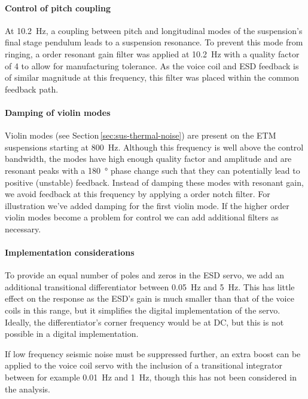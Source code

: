 \paragraph{Control of pitch coupling}
At \SI{10.2}{\hertz}, a coupling between pitch and longitudinal modes of the suspension's final stage pendulum leads to a suspension resonance. To prevent this mode from ringing, a  order resonant gain filter was applied at \SI{10.2}{\hertz} with a quality factor of \num{4} to allow for manufacturing tolerance. As the voice coil and \gls{ESD} feedback is of similar magnitude at this frequency, this filter was placed within the common feedback path.

\paragraph{Damping of violin modes}
Violin modes (see Section\,\ref{sec:sus-thermal-noise}) are present on the \gls{ETM} suspensions starting at \SI{800}{\hertz}. Although this frequency is well above the control bandwidth, the modes have high enough quality factor and amplitude and are resonant peaks with a \SI{180}{\degree} phase change such that they can potentially lead to positive (unstable) feedback. Instead of damping these modes with resonant gain, we avoid feedback at this frequency by applying a  order notch filter. For illustration we've added damping for the first violin mode. If the higher order violin modes become a problem for control we can add additional filters as necessary.

\paragraph{Implementation considerations}
To provide an equal number of poles and zeros in the \gls{ESD} servo, we add an additional transitional differentiator between \SI{0.05}{\hertz} and \SI{5}{\hertz}. This has little effect on the response as the \gls{ESD}'s gain is much smaller than that of the voice coils in this range, but it simplifies the digital implementation of the servo. Ideally, the differentiator's corner frequency would be at \gls{DC}, but this is not possible in a digital implementation.

If low frequency seismic noise must be suppressed further, an extra boost can be applied to the voice coil servo with the inclusion of a transitional integrator between for example \SI{0.01}{\hertz} and \SI{1}{\hertz}, though this has not been considered in the analysis.


